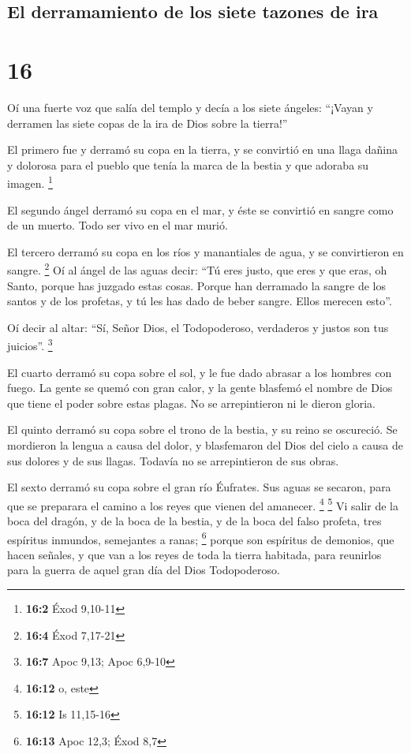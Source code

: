 \begin{paracol}{2}
{\subsection{El derramamiento de los siete tazones de
ira}\label{el-derramamiento-de-los-siete-tazones-de-ira}}

\hypertarget{section-30}{%
\section{16}\label{section-30}}

 Oí una fuerte voz que salía del templo y decía a los
siete ángeles: ``¡Vayan y derramen las siete copas de la ira de Dios
sobre la tierra!''

 El primero fue y derramó su copa en la tierra, y se
convirtió en una llaga dañina y dolorosa para el pueblo que tenía la
marca de la bestia y que adoraba su imagen. \footnote{\textbf{16:2} Éxod
  9,10-11}

 El segundo ángel derramó su copa en el mar, y éste se
convirtió en sangre como de un muerto. Todo ser vivo en el mar murió.

 El tercero derramó su copa en los ríos y manantiales de
agua, y se convirtieron en sangre. \footnote{\textbf{16:4} Éxod 7,17-21}
 Oí al ángel de las aguas decir: ``Tú eres justo, que eres
y que eras, oh Santo, porque has juzgado estas cosas. 
Porque han derramado la sangre de los santos y de los profetas, y tú les
has dado de beber sangre. Ellos merecen esto''.

 Oí decir al altar: ``Sí, Señor Dios, el Todopoderoso,
verdaderos y justos son tus juicios''. \footnote{\textbf{16:7} Apoc
  9,13; Apoc 6,9-10}

 El cuarto derramó su copa sobre el sol, y le fue dado
abrasar a los hombres con fuego.  La gente se quemó con
gran calor, y la gente blasfemó el nombre de Dios que tiene el poder
sobre estas plagas. No se arrepintieron ni le dieron gloria.

 El quinto derramó su copa sobre el trono de la bestia, y
su reino se oscureció. Se mordieron la lengua a causa del dolor,
 y blasfemaron del Dios del cielo a causa de sus dolores
y de sus llagas. Todavía no se arrepintieron de sus obras.

 El sexto derramó su copa sobre el gran río Éufrates. Sus
aguas se secaron, para que se preparara el camino a los reyes que vienen
del amanecer. \footnote{\textbf{16:12} o, este} \footnote{\textbf{16:12}
  Is 11,15-16}  Vi salir de la boca del dragón, y de la
boca de la bestia, y de la boca del falso profeta, tres espíritus
inmundos, semejantes a ranas; \footnote{\textbf{16:13} Apoc 12,3; Éxod
  8,7}  porque son espíritus de demonios, que hacen
señales, y que van a los reyes de toda la tierra habitada, para
reunirlos para la guerra de aquel gran día del Dios Todopoderoso.


\end{paracol}
